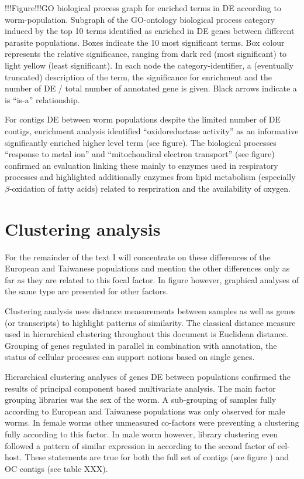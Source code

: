 \documentclass[10pt]{article}
\begin{document}
!!!Figure!!!GO biological process graph for enriched terms in DE
according to worm-population. Subgraph of the GO-ontology biological
process category induced by the top 10 terms identified as enriched in
DE genes between different parasite populations. Boxes indicate the 10
most significant terms. Box colour represents the relative
significance, ranging from dark red (most significant) to light yellow
(least significant). In each node the category-identifier, a
(eventually truncated) description of the term, the significance for
enrichment and the number of DE / total number of annotated gene is
given. Black arrows indicate a is ``is-a'' relationship.

For contigs DE between worm populations despite the limited number of
DE contigs, enrichment analysis identified ``oxidoreductase activity''
as an informative significantly enriched higher level term (see
figure). The biological processes ``response to metal ion'' and
``mitochondiral electron transport'' (see figure) confirmed an
evaluation linking these mainly to enzymes used in respiratory
processes and highlighted additionally enzymes from lipid metabolism
(especially $\beta$-oxidation of fatty acids) related to respriration
and the availability of oxygen.

\section{Clustering analysis}

For the remainder of the text I will concentrate on these differences
of the European and Taiwanese populations and mention the other
differences only as far as they are related to this focal factor. In
figure however, graphical analyses of the same type are presented for
other factors.

Clustering analysis uses distance measurements between samples as well
as genes (or transcripts) to highlight patterns of similarity. The
classical distance measure used in hierarchical clustering throughout
this document is Euclidean distance. Grouping of genes regulated in
parallel in combination with annotation, the status of cellular
processes can support notions based on single genes.

Hierarchical clustering analyses of genes DE between populations
confirmed the results of principal component based multivariate
analysis. The main factor grouping libraries was the sex of the
worm. A sub-grouping of samples fully according to European and
Taiwanese populations was only observed for male worms. In female
worms other unmeasured co-factors were preventing a clustering fully
according to this factor. In male worm however, library clustering
even followed a pattern of similar expression in according to the
second factor of eel-host. These statements are true for both the full
set of contigs (see figure ) and OC contigs (see table XXX).
\end{document}
